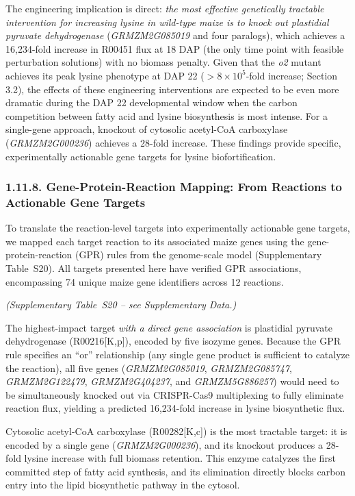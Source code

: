 \documentclass[12pt,a4paper]{article}
\begin{document}
The engineering implication is direct: \textit{the most effective genetically tractable intervention for increasing lysine in wild-type maize is to knock out plastidial pyruvate dehydrogenase} (\textit{GRMZM2G085019} and four paralogs), which achieves a 16,234-fold increase in R00451 flux at 18 DAP (the only time point with feasible perturbation solutions) with no biomass penalty. Given that the \textit{o2} mutant achieves its peak lysine phenotype at DAP 22 ($>8 \times 10^{5}$-fold increase; Section 3.2), the effects of these engineering interventions are expected to be even more dramatic during the DAP 22 developmental window when the carbon competition between fatty acid and lysine biosynthesis is most intense. For a single-gene approach, knockout of cytosolic acetyl-CoA carboxylase (\textit{GRMZM2G000236}) achieves a 28-fold increase. These findings provide specific, experimentally actionable gene targets for lysine biofortification.

\subsubsection{1.11.8. Gene-Protein-Reaction Mapping: From Reactions to Actionable Gene Targets}

To translate the reaction-level targets into experimentally actionable gene targets, we mapped each target reaction to its associated maize genes using the gene-protein-reaction (GPR) rules from the genome-scale model (Supplementary Table~S20). All targets presented here have verified GPR associations, encompassing 74 unique maize gene identifiers across 12 reactions.


\noindent\textit{(Supplementary Table~S20 -- see Supplementary Data.)}


The highest-impact target \textit{with a direct gene association} is plastidial pyruvate dehydrogenase (R00216[K,p]), encoded by five isozyme genes. Because the GPR rule specifies an ``or'' relationship (any single gene product is sufficient to catalyze the reaction), all five genes (\textit{GRMZM2G085019}, \textit{GRMZM2G085747}, \textit{GRMZM2G122479}, \textit{GRMZM2G404237}, and \textit{GRMZM5G886257}) would need to be simultaneously knocked out via CRISPR-Cas9 multiplexing to fully eliminate reaction flux, yielding a predicted 16,234-fold increase in lysine biosynthetic flux.

Cytosolic acetyl-CoA carboxylase (R00282[K,c]) is the most tractable target: it is encoded by a single gene (\textit{GRMZM2G000236}), and its knockout produces a 28-fold lysine increase with full biomass retention. This enzyme catalyzes the first committed step of fatty acid synthesis, and its elimination directly blocks carbon entry into the lipid biosynthetic pathway in the cytosol.
\end{document}
